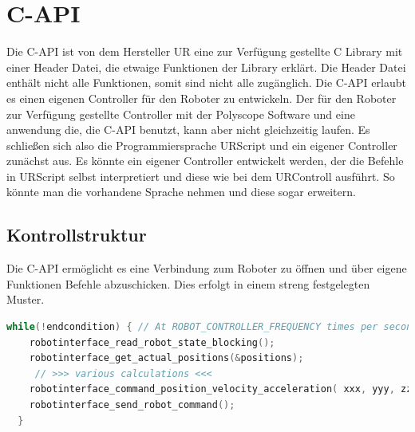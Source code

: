 \section{C-API}
\label{sec:rest_prinzip_gru}

Die C-\ac{API} ist von dem Hersteller \acs{UR} eine zur Verfügung gestellte C \acs{Library} mit einer Header Datei, die etwaige Funktionen der Library erklärt. Die Header Datei enthält nicht alle Funktionen, somit sind nicht alle zugänglich. Die C-\acs{API} erlaubt es einen eigenen Controller für den Roboter zu entwickeln. Der für den Roboter zur Verfügung gestellte Controller mit der Polyscope Software und eine anwendung die, die C-\acs{API} benutzt, kann aber nicht gleichzeitig laufen. Es schließen sich also die Programmiersprache URScript  und ein eigener Controller zunächst aus. Es könnte ein eigener Controller entwickelt werden, der die Befehle in URScript selbst interpretiert und diese wie bei dem URControll ausführt. So könnte man die vorhandene Sprache nehmen und diese sogar erweitern.

\subsection{Kontrollstruktur}
\label{capi_control_loop_gru}	

Die C-\acs{API} ermöglicht es eine Verbindung zum Roboter zu öffnen und über eigene Funktionen Befehle abzuschicken. Dies erfolgt in einem streng festgelegten Muster.

\begin{lstlisting}[language=C,caption={Beispiel der Kontroll Struktur}, label=lst:robot_control_loop,captionpos=b]
  while(!endcondition) { // At ROBOT_CONTROLLER_FREQUENCY times per second
    robotinterface_read_robot_state_blocking();
    robotinterface_get_actual_positions(&positions);
     // >>> various calculations <<<
    robotinterface_command_position_velocity_acceleration( xxx, yyy, zzz);
    robotinterface_send_robot_command();
  }
\end{lstlisting}


